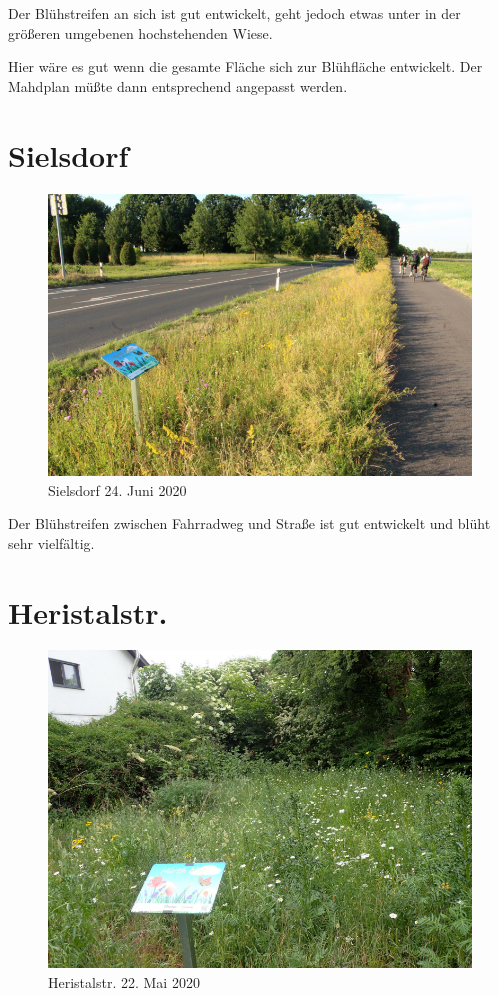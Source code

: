 \documentclass[11pt]{article}
\begin{document}
Der Blühstreifen an sich ist gut entwickelt, geht jedoch etwas unter in der größeren umgebenen hochstehenden Wiese.

Hier wäre es gut wenn die gesamte Fläche sich zur Blühfläche entwickelt. Der Mahdplan müßte dann entsprechend angepasst werden.

\clearpage
\section{Sielsdorf}
\begin{figure}[h!]
  \includegraphics[width=\linewidth]{img/sielsdorf/juni.jpg}
  \caption{Sielsdorf 24. Juni 2020}
  \label{fig:sielsdorf}
\end{figure}

Der Blühstreifen zwischen Fahrradweg und Straße ist gut entwickelt und blüht sehr vielfältig.

\clearpage
\section{Heristalstr.}
\begin{figure}[h!]
  \includegraphics[width=\linewidth]{img/heristal/mai.jpg}
  \caption{Heristalstr. 22. Mai 2020}
  \label{fig:boat1}
\end{figure}
\end{document}
